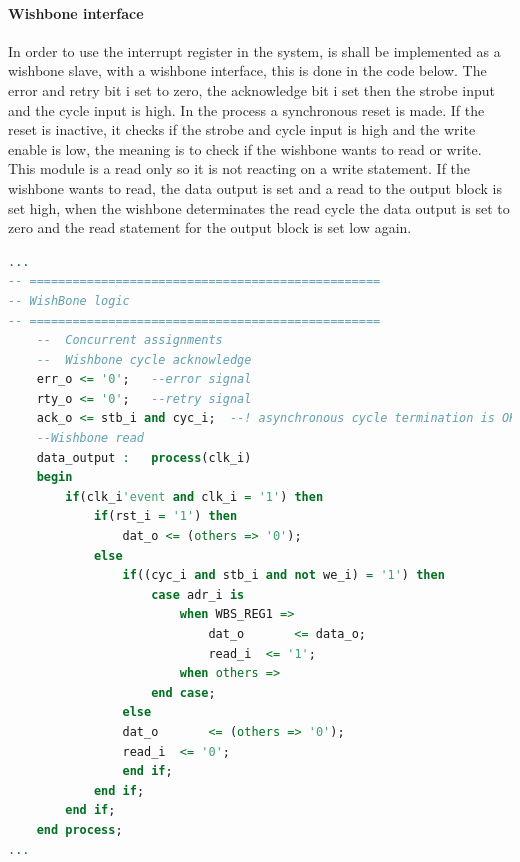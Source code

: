 \paragraph{Wishbone interface}
In order to use the interrupt register in the system, is shall be implemented as a wishbone slave, with a wishbone interface, this is done in the code below. The error and retry bit i set to zero, the acknowledge bit i set then the strobe input and the cycle input is high. In the process a synchronous reset is made. If the reset is inactive, it checks if the strobe and cycle input is high and the write enable is low, the meaning is to check if the wishbone wants to read or write. This module is a read only so it is not reacting on a write statement. If the wishbone wants to read, the data output is set and a read to the output block is set high, when the wishbone determinates the read cycle the data output is set to zero and the read statement for the output block is set low again.
\begin{lstlisting}[language=VHDL]
...
-- =================================================
-- WishBone logic
-- =================================================
	--  Concurrent assignments
	--	Wishbone cycle acknowledge
	err_o <= '0';	--error signal
	rty_o <= '0';	--retry signal
	ack_o <= stb_i and cyc_i;  --! asynchronous cycle termination is OK here.
	--Wishbone read
	data_output	:	process(clk_i)
	begin
		if(clk_i'event and clk_i = '1') then
			if(rst_i = '1') then
				dat_o <= (others => '0');
			else
				if((cyc_i and stb_i and not we_i) = '1') then
					case adr_i is
						when WBS_REG1 =>
							dat_o		<= data_o;
							read_i	<= '1';
						when others =>
					end case;
				else
				dat_o		<= (others => '0');
				read_i	<= '0';
				end if;
			end if;
		end if;			
	end process;
...
\end{lstlisting}
%
%
